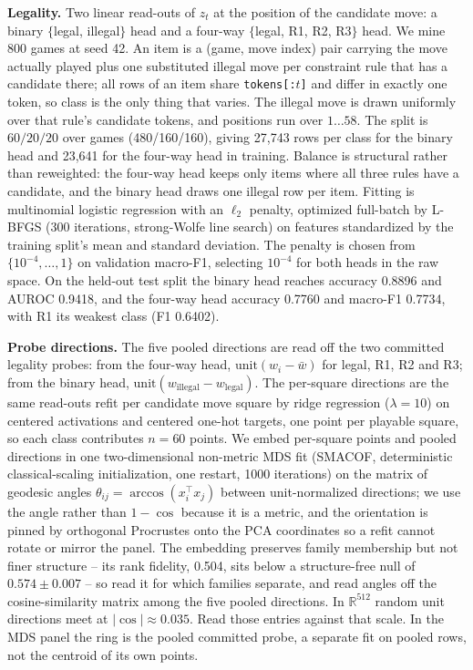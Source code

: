 \documentclass{article}
\begin{document}
\textbf{Legality.} Two linear read-outs of $z_t$ at the position of the candidate move: a binary
$\{$legal, illegal$\}$ head and a four-way $\{$legal, R1, R2, R3$\}$ head. We mine 800 games at
seed 42. An item is a (game, move index) pair carrying the move actually played plus one
substituted illegal move per constraint rule that has a candidate there; all rows of an item
share \texttt{tokens[:$t$]} and differ in exactly one token, so class is the only thing that
varies. The illegal move is drawn uniformly over that rule's candidate tokens, and positions run
over $1 \ldots 58$. The split is $60/20/20$ over games (480/160/160), giving 27,743 rows per
class for the binary head and 23,641 for the four-way head in training. Balance is structural
rather than reweighted: the four-way head keeps only items where all three rules have a
candidate, and the binary head draws one illegal row per item. Fitting is multinomial logistic
regression with an $\ell_2$ penalty, optimized full-batch by L-BFGS (300 iterations,
strong-Wolfe line search) on features standardized by the training split's mean and standard
deviation. The penalty is chosen from $\{10^{-4}, \ldots, 1\}$ on validation macro-F1, selecting
$10^{-4}$ for both heads in the raw space. On the held-out test split the binary head reaches accuracy 0.8896 and
AUROC 0.9418, and the four-way head accuracy 0.7760 and macro-F1 0.7734, with R1 its weakest
class (F1 0.6402).

\textbf{Probe directions.} The five pooled directions are read off the two committed legality
probes: from the four-way head, $\mathrm{unit}(w_i - \bar{w})$ for legal, R1, R2 and R3; from the
binary head, $\mathrm{unit}(w_{\mathrm{illegal}} - w_{\mathrm{legal}})$. The per-square directions are the
same read-outs refit per candidate move square by ridge regression ($\lambda = 10$) on centered
activations and centered one-hot targets, one point per playable square, so each class
contributes $n = 60$ points. We embed per-square points and pooled directions in one
two-dimensional non-metric MDS fit (SMACOF, deterministic classical-scaling initialization, one
restart, 1000 iterations) on the matrix of geodesic angles $\theta_{ij} = \arccos(x_i^\top x_j)$
between unit-normalized directions; we use the angle rather than $1 - \cos$ because it is a
metric, and the orientation is pinned by orthogonal Procrustes onto the PCA coordinates so a
refit cannot rotate or mirror the panel. The embedding preserves family membership but not finer
structure -- its rank fidelity, 0.504, sits below a structure-free null of $0.574 \pm 0.007$ --
so read it for which families separate, and read angles off the cosine-similarity matrix among
the five pooled directions. In $\mathbb{R}^{512}$ random unit directions meet at $|\cos| \approx
0.035$. Read those entries against that scale. In the MDS panel
the ring is the pooled committed probe, a separate fit on pooled rows, not the centroid of its
own points.
\end{document}

